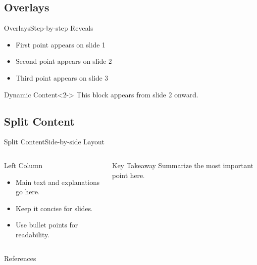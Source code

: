 \documentclass[
11pt,hyperref={pdfauthor=whatever}
]{beamer}
\begin{document}
\subsection{Overlays}
\begin{frame}{Overlays}{Step-by-step Reveals}
\begin{itemize}
    \item<1-> First point appears on slide 1
    \item<2-> Second point appears on slide 2
    \item<3-> Third point appears on slide 3
\end{itemize}

\vspace{0.5cm}

\begin{block}{Dynamic Content}<2->
    This block appears from slide 2 onward.
\end{block}
\end{frame}

\subsection{Split Content}
\begin{frame}{Split Content}{Side-by-side Layout}
\begin{columns}[T,onlytextwidth]
    \begin{block}{Left Column}
        \begin{itemize}
            \item Main text and explanations go here.
            \item Keep it concise for slides.
            \item Use bullet points for readability.
        \end{itemize}
    \end{block}

    \begin{alertblock}{Key Takeaway}
        Summarize the most important point here.
    \end{alertblock}
\end{columns}
\end{frame}

\begin{frame}[allowframebreaks]{References}
    \printbibliography
\end{frame}
\end{document}
